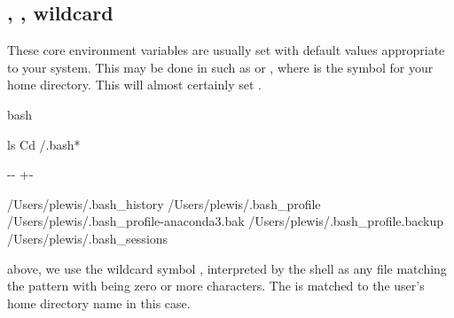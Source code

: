 \documentclass[letterpaper,10pt,english]{sphinxmanual}
\newlength\nbsphinxcodecellspacing
\begin{document}
\subsection{, , wildcard \sphinxstyleliteralintitle{\sphinxupquote{*}}}
\label{\detokenize{Appendix1:.bash_profile,-.bashrc,-wildcard-*}}
These core environment variables are usually set with default values appropriate to your system. This may be done in  such as  or , where \sphinxcode{\sphinxupquote{\textasciitilde{}}} is the symbol for your home directory. This will almost certainly set .

{
\begin{sphinxVerbatim}[commandchars=\\\{\}]
\llap{\color{nbsphinxin}[8]:\,\hspace{\fboxrule}\hspace{\fboxsep}}\PYGZpc{}\PYGZpc{}bash

ls \PYGZhy{}Cd  \PYGZti{}/.bash*
\end{sphinxVerbatim}
}

{

\kern-\sphinxverbatimsmallskipamount\kern-\baselineskip
\kern+\FrameHeightAdjust\kern-\fboxrule
\vspace{\nbsphinxcodecellspacing}

\begin{sphinxVerbatim}[commandchars=\\\{\}]
/Users/plewis/.bash\_history
/Users/plewis/.bash\_profile
/Users/plewis/.bash\_profile-anaconda3.bak
/Users/plewis/.bash\_profile.backup
/Users/plewis/.bash\_sessions
\end{sphinxVerbatim}
}

above, we use the wildcard symbol \sphinxcode{\sphinxupquote{*}}, interpreted by the shell as any file matching the pattern  with \sphinxcode{\sphinxupquote{*}} being zero or more characters. The \sphinxcode{\sphinxupquote{\textasciitilde{}}} is matched to the user’s home directory name in this case.
\end{document}
